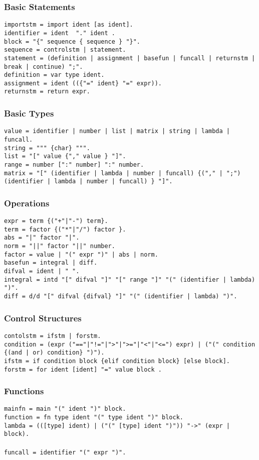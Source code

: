 \documentclass[10pt,a4paper,titlepage]{article}
\newcommand{\ebnf}[2]{
	\texttt{#1 = #2.}\\}
\begin{document}
\subsubsection{Basic Statements}
\ebnf{importstm}{import ident [as ident]}
\ebnf{identifier}{ident { "." ident }}
\ebnf{block}{"\{" sequence \{ sequence \} "\}"}
\ebnf{sequence}{controlstm | statement}
\ebnf{statement}{(definition | assignment | basefun | funcall | returnstm | break | continue) ";"}
\ebnf{definition}{var type ident}
\ebnf{assignment}{ident ((\{"=" ident\} "=" expr))}
\ebnf{returnstm}{return expr}

\subsubsection{Basic Types}
\ebnf{value}{identifier | number | list | matrix | string | lambda | funcall}
\ebnf{string}{""" \{char\} """}
\ebnf{list}{"[" value \{"," value \} "]"}
\ebnf{range}{number [":" number] ":" number}
\ebnf{matrix}{"[" (identifier | lambda | number | funcall) \{("," | ";") (identifier | lambda | number | funcall) \} "]"}

\subsubsection{Operations}
\ebnf{expr}{term \{("+"|"-") term\}}
\ebnf{term}{factor \{("*"|"/") factor \}}
\ebnf{abs}{"|" factor "|"}
\ebnf{norm}{"||" factor "||" number}
\ebnf{factor}{value | "(" expr ")" | abs | norm}

\ebnf{basefun}{integral | diff}
\ebnf{difval}{ident | "~"}
\ebnf{integral}{intd "[" difval "]" "[" range "]" "(" (identifier | lambda) ")"}
\ebnf{diff}{d/d "[" difval \{difval\} "]" "(" (identifier | lambda) ")"}

\subsubsection{Control Structures}
\ebnf{contolstm}{ifstm | forstm}
\ebnf{condition}{(expr ("=="|"!="|">"|">="|"<"|"<=") expr) | ("(" condition \{(and | or) condition\} ")")}
\ebnf{ifstm}{if condition block \{elif condition block\} [else block]}
\ebnf{forstm}{for ident [ident] "=" value block }

\subsubsection{Functions}
\ebnf{mainfn}{main "(" ident ")" block}
\ebnf{function}{fn type ident "(" {type ident} ")" block}
\ebnf{lambda}{(([type] ident) | ("(" {[type] ident} ")")) "->" (expr | block)}
\\
\ebnf{funcall}{identifier "(" {expr} ")"}
\end{document}
